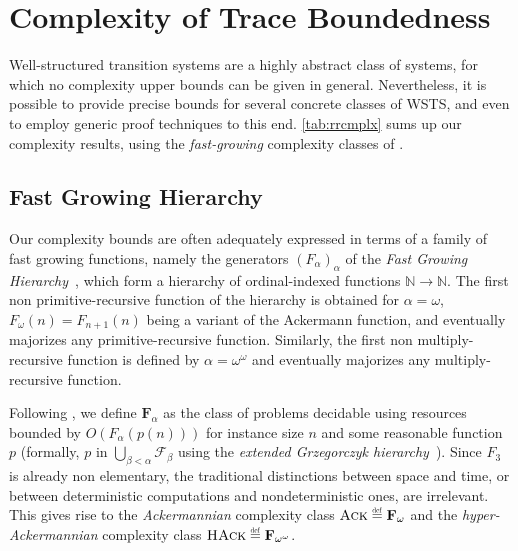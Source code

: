 \documentclass[11pt,reqno,a4paper]{amsart}
\newcommand{\eqdef}{\stackrel{\raisebox{-.15ex}{\scalebox{.5}{\upshape\textrm{def}}}}{=}}
\theoremstyle{plain}
\theoremstyle{definition}
\theoremstyle{remark}
\begin{document}
\section{Complexity of Trace Boundedness}\label{sec:cmplx}
Well-structured transition systems are a highly abstract class of
systems, for which no complexity upper bounds can be given in general.
Nevertheless, it is possible to provide precise bounds for several
concrete classes of WSTS, and even to employ generic proof techniques
to this end.  \autoref{tab:rrcmplx} sums up our complexity results,
using the \emph{fast-growing} complexity classes of \citep{schmitz13}.
\begin{table}[t]
\caption{\label{tab:rrcmplx}Summary of complexity results for trace
    boundedness.} 
\end{table}

\subsection{Fast Growing Hierarchy}
Our complexity bounds are often adequately expressed in terms of a
family of fast growing functions, namely the generators
$(F_\alpha)_\alpha$ of the \emph{Fast Growing
  Hierarchy}~\citep{fastgr}, which form a hierarchy of ordinal-indexed
functions $\mathbb{N}\to\mathbb{N}$.  The first non primitive-recursive
function of the hierarchy is obtained for $\alpha=\omega$,
$F_\omega(n)=F_{n+1}(n)$ being a variant of the Ackermann function, and
eventually majorizes any primitive-recursive function.
Similarly, the first non multiply-recursive function is defined by
$\alpha=\omega^\omega$ and eventually majorizes any multiply-recursive
function.

Following \citep{schmitz13}, we define $\mathbf{F}_\alpha$
as the class of problems decidable using resources bounded by
$O(F_\alpha(p(n)))$ for instance size $n$ and some reasonable function
$p$ (formally, $p$ in $\bigcup_{\beta<\alpha}\mathscr{F}_{\beta}$
using the \emph{extended Grzegorczyk hierarchy}~\citep{fastgr}).
Since $F_3$ is already non elementary, the traditional distinctions
between space and time, or between deterministic computations and
nondeterministic ones, are irrelevant.  This gives rise to the
\emph{Ackermannian} complexity class
$\text{\textsc{Ack}}\eqdef\mathbf{F}_\omega$ and the
\emph{hyper-Ackermannian} complexity class $\text{\textsc{HAck}}\eqdef\mathbf{F}_{\omega^\omega}$.
\end{document}
